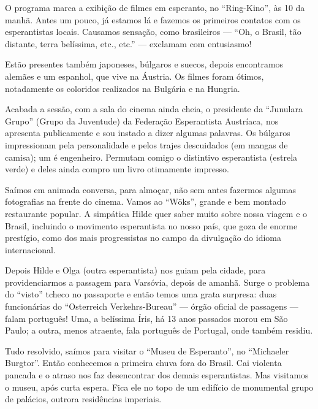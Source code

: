 O programa marca a exibição de filmes em esperanto, no ``Ring-Kino'', às 10 da manhã. Antes um pouco, já estamos lá e fazemos os primeiros contatos com os esperantistas locais. Causamos sensação, como brasileiros --- ``Oh, o Brasil, tão distante, terra belíssima, etc., etc.'' --- exclamam com entusiasmo!

Estão presentes também japoneses, búlgaros e suecos, depois encontramos alemães e um espanhol, que vive na Áustria. Os filmes foram ótimos, notadamente os coloridos realizados na Bulgária e na Hungria.

Acabada a sessão, com a sala do cinema ainda cheia, o presidente da ``Junulara Grupo'' (Grupo da Juventude) da Federação Esperantista Austríaca, nos apresenta publicamente e sou instado a dizer algumas palavras. Os búlgaros impressionam pela personalidade e pelos trajes descuidados (em mangas de camisa); um é engenheiro. Permutam comigo o distintivo esperantista (estrela verde) e deles ainda compro um livro otimamente impresso.

Saímos em animada conversa, para almoçar, não sem antes fazermos algumas fotografias na frente do cinema. Vamos ao ``Wöks'', grande e bem montado restaurante popular. A simpática Hilde quer saber muito sobre nossa viagem e o Brasil, incluindo o movimento esperantista no nosso país, que goza de enorme prestígio, como dos mais progressistas no campo da divulgação do idioma internacional.

Depois Hilde e Olga (outra esperantista) nos guiam pela cidade, para providenciarmos a passagem para Varsóvia, depois de amanhã. Surge o problema do ``visto'' tcheco no passaporte e então temos uma grata surpresa: duas funcionárias do ``Osterreich Verkehrs-Bureau'' --- órgão oficial de passagens --- falam português! Uma, a belíssima Íris, há 13 anos passados morou em São Paulo; a outra, menos atraente, fala português de Portugal, onde também residiu.

Tudo resolvido, saímos para visitar o ``Museu de Esperanto'', no ``Michaeler Burgtor''. Então conhecemos a primeira chuva fora do Brasil. Cai violenta pancada e o atraso nos faz desencontrar dos demais esperantistas. Mas visitamos o museu, após curta espera. Fica ele no topo de um edifício de monumental grupo de palácios, outrora residências imperiais.

